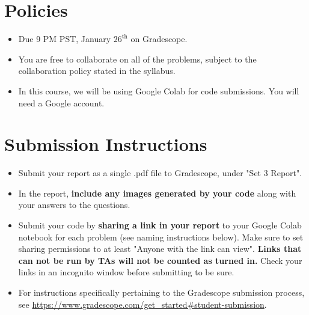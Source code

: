 \newif\ifshowsolutions
\showsolutionstrue







\pagestyle{fancy}




\section*{Policies}
\begin{itemize}
	\item Due 9 PM PST, January $26^\text{th}$ on Gradescope. 
	\item You are free to collaborate on all of the problems, subject to the collaboration policy stated in the syllabus.
	\item In this course, we will be using Google Colab for code submissions. You will need a Google account.
\end{itemize}

\section*{Submission Instructions}
\begin{itemize}
	\item Submit your report as a single .pdf file to Gradescope, under "Set 3 Report". 
	\item In the report, \textbf{include any images generated by your code} along with your answers to the questions.
	\item Submit your code by \textbf{sharing a link in your report} to your Google Colab notebook for each problem (see naming instructions below). Make sure to set sharing permissions to at least "Anyone with the link can view". \textbf{Links that can not be run by TAs will not be counted as turned in.} Check your links in an incognito window before submitting to be sure. 
	\item For instructions specifically pertaining to the Gradescope submission process, see \url{https://www.gradescope.com/get_started#student-submission}.
\end{itemize}

